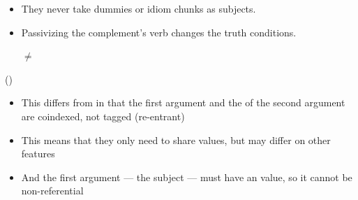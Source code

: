 \documentclass[a4paper,landscape,headrule,footrule]{foils}
\begin{document}


\begin{itemize}
\item They never take dummies or idiom chunks as 
  subjects.
  \begin{xlisti}
    \ex {}
    \ex {}
    \ex {}
  \end{xlisti}
\item Passivizing the complement’s verb changes the truth 
conditions.
\begin{xlisti}
    \ex {}
    \trans $\not=$
    \ex {}
  \end{xlisti}
\end{itemize}

\begin{center} \small
{} ()\\
\end{center}

\begin{itemize}\addtolength{\itemsep}{-2ex}
\item This differs from  in that the first argument and the
    of the second argument are coindexed, not tagged (re-entrant)
\item This means that they only need to share  values, but may
   differ on other features
\item And the first argument --- the subject --- must have an 
  value, so it cannot be non-referential
\end{itemize}


\bigskip
\begin{center}
\end{center}
\end{document}
